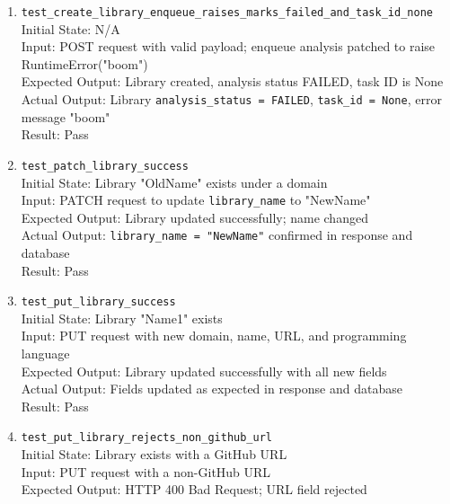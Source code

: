\documentclass[12pt, titlepage]{article}
\begin{document}
\begin{enumerate}
      \\Actual Output: Library created, \texttt{analysis\_status = PENDING}, \texttt{task\_id = "task-123"}
      \\Result: Pass
    \item \texttt{test\_create\_library\_enqueue\_raises\_marks\_failed\_and\_task\_id\_none} \label{test-create-library-enqueue-raises-marks-failed-and-task-id-none}
      \\Initial State: N/A
      \\Input: POST request with valid payload; enqueue analysis patched to raise RuntimeError("boom")
      \\Expected Output: Library created, analysis status FAILED, task ID is None
      \\Actual Output: Library \texttt{analysis\_status = FAILED}, \texttt{task\_id = None}, error message "boom"
      \\Result: Pass
    \item \texttt{test\_patch\_library\_success} \label{test-patch-library-success}
      \\Initial State: Library "OldName" exists under a domain
      \\Input: PATCH request to update \texttt{library\_name} to "NewName"
      \\Expected Output: Library updated successfully; name changed
      \\Actual Output: \texttt{library\_name = "NewName"} confirmed in response and database
      \\Result: Pass
    \item \texttt{test\_put\_library\_success} \label{test-put-library-success}
      \\Initial State: Library "Name1" exists
      \\Input: PUT request with new domain, name, URL, and programming language
      \\Expected Output: Library updated successfully with all new fields
      \\Actual Output: Fields updated as expected in response and database
      \\Result: Pass
    \item \texttt{test\_put\_library\_rejects\_non\_github\_url} \label{test-put-library-rejects-non-github-url}
      \\Initial State: Library exists with a GitHub URL
      \\Input: PUT request with a non-GitHub URL
      \\Expected Output: HTTP 400 Bad Request; URL field rejected

\end{enumerate}
\end{document}
